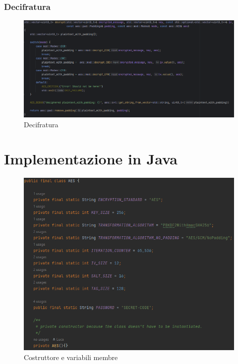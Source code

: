 \subsubsection{Decifratura}

\textsf{\small }

\begin{figure}[H]
	\centering
	\includegraphics[width=1\textwidth, height=1\textheight, keepaspectratio]{./images/code/cpp/api/decrypt.PNG}
	\caption{Decifratura}
	\label{fig:decrypt}
\end{figure}

\textsf{\small } %


\section{Implementazione in Java}

\textsf{\small } %

\begin{figure}[H]
	\centering
	\includegraphics[width=1\textwidth, height=1\textheight, keepaspectratio]{./images/code/java/constructor_and_member_variables.PNG}
	\caption{Costruttore e variabili membre}
	\label{fig:constructor_and_member_variables}
\end{figure}

